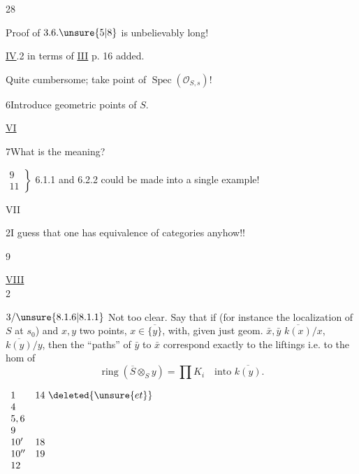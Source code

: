 28\quad{}


Proof of $3.6.\unsure{5|8}$ is unbelievably long!


\uline{IV}\quad {}.2  in terms of \uline{III} p. 16 added.

Quite  cumbersome; take point of
$\operatorname{Spec}(\mathcal O_{S,s})$!

6\quad Introduce geometric points of $S$.

\uline{VI}\quad{}

7\quad What is the meaning?

$\left.\begin{array}{l}9\\11\end{array}\right\}$
6.1.1 and 6.2.2 could be made into a single example!


VII

2\quad I guess that one has equivalence of categories anyhow!!


9

\uline{VIII}\\
\hspace*{3em}2

$3/\unsure{8.1.6|8.1.1}$ Not too clear. Say that if
(for instance the localization of $S$ at $s_0$)
and 
$x,y$ two points, $x\in\overline{\{y\}}$,
 with, given just geom. $\bar x,\bar y$
$\overline{k(x)}/x$, $\overline{k(y)}/y$, then the ``paths'' of $\bar y$ to $\bar x$
correspond exactly to the  liftings
i.e. to the hom of
\[
\operatorname{ring}(\overline S\otimes_S y)=\prod K_i
\quad\text{into }\overline{k(y)}.
\]

\quad
$\begin{array}{ll}
1&14\ \deleted{\unsure{et}}\\
4&\\
5,6&\\
9&\\
10'&18\\
10''&19\\
12&
\end{array}$

